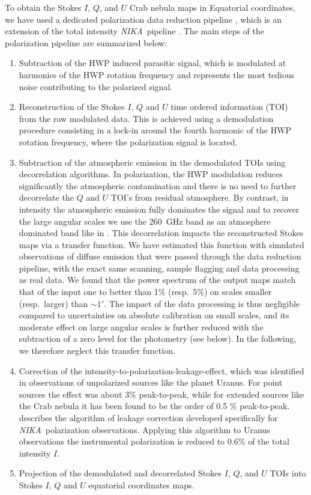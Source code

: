 \documentclass[twocolumn,traditabstract]{aa}
\def\NIKA{\textit{NIKA}}
\begin{document}
To obtain the Stokes $I$, $Q$, and $U$ Crab nebula maps in Equatorial coordinates, we have used a dedicated
polarization data reduction pipeline \citep{ritacco2017}, which is an extension
of the total intensity \NIKA\ pipeline \citep{catalano2014,adam2013}. The main steps
of the polarization pipeline are summarized below:
\begin{enumerate}
\item Subtraction of the HWP induced parasitic signal, which is modulated at harmonics of the HWP rotation frequency and represents the most tedious noise contributing to the polarized signal. 
\item Reconstruction of the Stokes $I$, $Q$ and $U$ time ordered information
  (TOI) from the raw modulated data. This is achieved using a demodulation
  procedure consisting in a lock-in around the fourth harmonic of the HWP rotation frequency, where the polarization signal is located.
\item Subtraction of the atmospheric emission in the demodulated TOIs using
  decorrelation algorithms. In polarization, the HWP modulation reduces
  significantly the atmospheric contamination and there is no need to
  further decorrelate the $Q$ and $U$ TOI's from residual atmosphere. By contrast, in
  intensity the atmospheric emission fully dominates the signal and to recover
  the large angular scales we use the 260~GHz band as an atmosphere
  dominated band like in \cite{adam2013}.  This decorrelation impacts the
  reconstructed Stokes maps via a transfer function. We have estimated this function
  with simulated observations of diffuse emission that were passed through the
  data reduction pipeline, with the exact same scanning, sample flagging and data
  processing as real data. We found that the power spectrum of the output maps
  match that of the input one to better than 1\% (resp.~5\%) on scales smaller
  (resp.~larger) than $\sim 1'$. The impact of the data processing is thus
  negligible compared to uncertainties on absolute calibration on small
  scales, and its moderate effect on large angular scales is further reduced
  with the subtraction of a zero level for the photometry (see below). In the
  following, we therefore neglect this transfer function.


\item Correction of the intensity-to-polarization-leakage-effect, which was
  identified in observations of unpolarized sources like the planet Uranus. For
  point sources the effect was about 3\% peak-to-peak, while for extended sources like the Crab nebula it has been found to be the order of 0.5 \% peak-to-peak. 
  \cite{ritacco2017} describes the algorithm of leakage correction developed specifically for \NIKA\ polarization observations. Applying this algorithm to Uranus observations the instrumental polarization is reduced to 0.6\% of the total intensity $I$.
  \item Projection of the demodulated and decorrelated Stokes $I$, $Q$, and $U$ TOIs into Stokes $I$, $Q$ and $U$ equatorial coordinates maps.

\end{enumerate}
\end{document}
